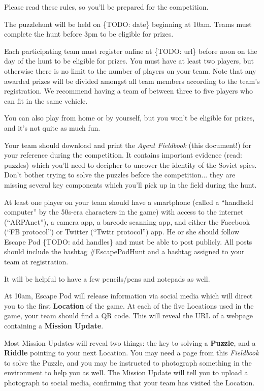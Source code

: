\documentclass{puzzlehunt}
\begin{document}
Please read these rules, so you'll be prepared for the competition.


The puzzlehunt will be held on \{TODO: date\} beginning at 10am. Teams must
complete the hunt before 3pm to be eligible for prizes.


Each participating team must register online at \{TODO: url\} before noon
on the day of the hunt to be eligible for prizes. You must have at least two
players, but otherwise there is no limit to the
number of players on your team. Note that any awarded prizes will be divided amongst
all team members according to the team's registration. We recommend having
a team of between three to five players who can fit in the same vehicle.

You can also play from home or by yourself, but you won't be eligible for prizes, and
it's not quite as much fun.


Your team should download and print the \textit{Agent Fieldbook} (this document!)
for your reference during the competition. It contains important evidence
(read: puzzles) which you'll need to decipher to uncover the identity of the
Soviet spies. Don't bother trying to solve the puzzles before the competition...
they are missing several key components which you'll pick up in the field during
the hunt.

At least one player on your team should have a smartphone (called a
``handheld computer'' by the 50s-era characters in the game) with access to the
internet (``ARPAnet''), a camera app, a barcode scanning app, and either
the Facebook (``FB protocol'') or Twitter (``Twttr protocol'') app.
He or she should follow Escape Pod \{TODO: add handles\} and must be able
to post publicly. All posts should include the hashtag \#EscapePodHunt
and a hashtag assigned to your team at registration.

It will be helpful to have a few pencils/pens and notepads as well.


At 10am, Escape Pod will release information via social media which will direct
you to the first \textbf{Location} of the game. At each of the five Locations used
in the game, your team should find a QR code. This will reveal the URL of a
webpage containing a \textbf{Mission Update}.

Most Mission Updates will reveal two things: the key to solving a \textbf{Puzzle},
and a \textbf{Riddle} pointing to your next Location. You may need a page from
this \textit{Fieldbook} to solve the Puzzle, and you may be instructed
to photograph something in the environment to help you as well. The Mission Update
will tell you to upload a photograph to social media, confirming that your team
has visited the Location.
\end{document}
